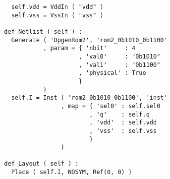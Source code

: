 \begin{itemize}
\begin{verbatim}
    self.vdd = VddIn ( "vdd" )
    self.vss = VssIn ( "vss" )
    
  def Netlist ( self ) :
    Generate ( 'DpgenRom2', 'rom2_0b1010_0b1100'
             , param = { 'nbit'     : 4
                       , 'val0'     : "0b1010"
                       , 'val1'     : "0b1100"
                       , 'physical' : True
                       }
             )
    self.I = Inst ( 'rom2_0b1010_0b1100', 'inst'
                  , map = { 'sel0' : self.sel0
                          , 'q'    : self.q
                          , 'vdd'  : self.vdd
                          , 'vss'  : self.vss
                          }
                  )
  
  def Layout ( self ) :
    Place ( self.I, NOSYM, Ref(0, 0) )  
\end{verbatim}
\end{itemize}
